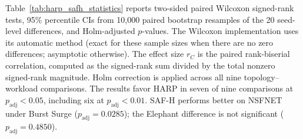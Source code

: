 \documentclass[final,5p]{elsarticle}
\newcommand{\rev}[1]{\textcolor{BrickRed}{#1}}
\begin{document}
\rev{Table~\ref{tab:harp_safh_statistics} reports two-sided paired Wilcoxon signed-rank tests, 95\% percentile CIs from 10,000 paired bootstrap resamples of the 20 seed-level differences, and Holm-adjusted \(p\)-values. The Wilcoxon implementation uses its automatic method (exact for these sample sizes when there are no zero differences; asymptotic otherwise). The effect size \(r_C\) is the paired rank-biserial correlation, computed as the signed-rank sum divided by the total nonzero signed-rank magnitude. Holm correction is applied across all nine topology--workload comparisons. The results favor HARP in seven of nine comparisons at \(p_{\mathrm{adj}}<0.05\), including six at \(p_{\mathrm{adj}}<0.01\). \rev{SAF-H performs better on NSFNET under Burst Surge (\(p_{\mathrm{adj}}=0.0285\));} the Elephant difference is not significant (\(p_{\mathrm{adj}}=0.4850\)).}

\begin{table}[!tb]
\centering
\caption{\rev{HARP--SAF-H safe-acceptance differences (percentage points) with 95\% paired bootstrap CIs and Holm-adjusted $p$-values ($N=20$ matched seeds).}}
\label{tab:harp_safh_statistics}
\renewcommand{\arraystretch}{1.12}
\small
{}
\end{table}
\end{document}
